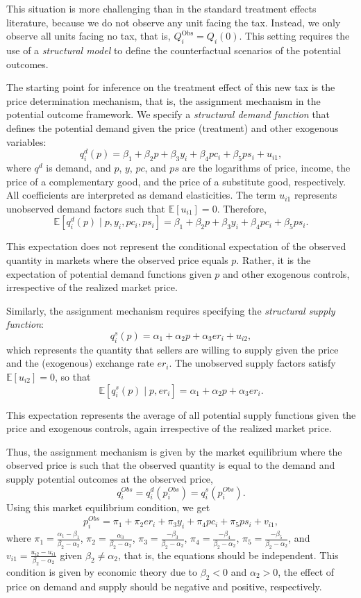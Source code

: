 This situation is more challenging than in the standard treatment effects literature, because we do not observe any unit facing the tax. Instead, we only observe all units facing no tax, that is, $Q_i^{\text{Obs}} = Q_i(0)$. This setting requires the use of a \textit{structural model} to define the counterfactual scenarios of the potential outcomes.

The starting point for inference on the treatment effect of this new tax is the price determination mechanism, that is, the assignment mechanism in the potential outcome framework. We specify a \textit{structural demand function} that defines the potential demand given the price (treatment) and other exogenous variables:
\[
q_i^d(p) = \beta_1 + \beta_2 p + \beta_3 y_i + \beta_4 pc_i + \beta_5 ps_i + u_{i1},
\]
where $q^d$ is demand, and $p$, $y$, $pc$, and $ps$ are the logarithms of price, income, the price of a complementary good, and the price of a substitute good, respectively. All coefficients are interpreted as demand elasticities. The term $u_{i1}$ represents unobserved demand factors such that $\mathbb{E}[u_{i1}]=0$. Therefore,
\[
\mathbb{E}[q_i^d(p)\mid p, y_i, pc_i, ps_i] = \beta_1 + \beta_2 p + \beta_3 y_i + \beta_4 pc_i + \beta_5 ps_i.
\]

This expectation does not represent the conditional expectation of the observed quantity in markets where the observed price equals $p$. Rather, it is the expectation of potential demand functions given $p$ and other exogenous controls, irrespective of the realized market price.

Similarly, the assignment mechanism requires specifying the \textit{structural supply function}:
\[
q_i^s(p) = \alpha_1 + \alpha_2 p + \alpha_3 er_i + u_{i2},
\]
which represents the quantity that sellers are willing to supply given the price and the (exogenous) exchange rate $er_i$. The unobserved supply factors satisfy $\mathbb{E}[u_{i2}]=0$, so that
\[
\mathbb{E}[q_i^s(p)\mid p, er_i] = \alpha_1 + \alpha_2 p + \alpha_3 er_i.
\]

This expectation represents the average of all potential supply functions given the price and exogenous controls, again irrespective of the realized market price.

Thus, the assignment mechanism is given by the market equilibrium where the observed price is such that the observed quantity is equal to the demand and supply potential outcomes at the observed price,
\[
q_i^{Obs}=q_i^d(p_i^{Obs})=q_i^s(p_i^{Obs}).
\] 
Using this market equilibrium condition, we get
\begin{align*}
	p_i^{Obs}=\pi_1+\pi_2 er_i + \pi_3 y_i + \pi_4 pc_i + \pi_5 ps_i + v_{i1},
\end{align*}
where $\pi_1=\frac{\alpha_1-\beta_1}{\beta_2-\alpha_2}$, $\pi_2=\frac{\alpha_3}{\beta_2-\alpha_2}$, $\pi_3=\frac{-\beta_3}{\beta_2-\alpha_2}$, $\pi_4=\frac{-\beta_4}{\beta_2-\alpha_2}$, $\pi_5=\frac{-\beta_5}{\beta_2-\alpha_2}$, and $v_{i1}=\frac{u_{i2}-u_{i1}}{\beta_2-\alpha_2}$ given $\beta_2\neq\alpha_2$, that is, the equations should be independent. This condition is given by economic theory due to $\beta_2<0$ and $\alpha_2>0$, the effect of price on demand and supply should be negative and positive, respectively.

